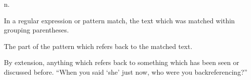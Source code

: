  n.

\begin{inparaenum}
	\item In a regular expression or pattern match, the text which was matched
		within grouping parentheses.
	\item The part of the pattern which refers back to the matched text.
	\item By extension, anything which refers back to something which has been
		seen or discussed before. ``When you said `she' just now, who were you
		backreferencing?''
\end{inparaenum}

